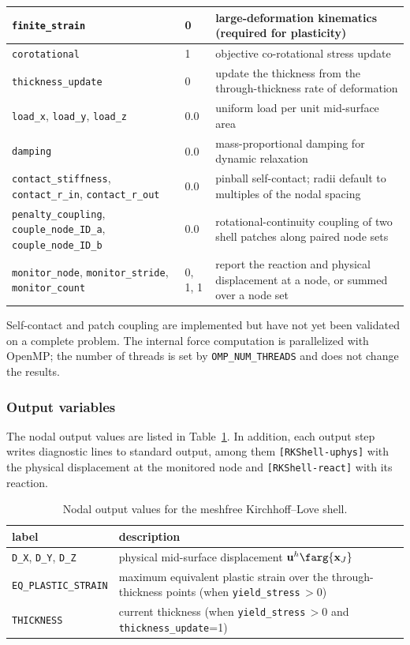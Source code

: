 \begin{longtable}{|p{1.7in}|p{0.7in}|p{3.4in}|}
\texttt{finite\_strain} & 0 & large-deformation kinematics (required for plasticity)\\ \hline
\texttt{corotational} & 1 & objective co-rotational stress update\\ \hline
\texttt{thickness\_update} & 0 & update the thickness from the through-thickness rate of deformation\\ \hline
\texttt{load\_x}, \texttt{load\_y}, \texttt{load\_z} & 0.0 & uniform load per unit mid-surface area\\ \hline
\texttt{damping} & 0.0 & mass-proportional damping for dynamic relaxation\\ \hline
\texttt{contact\_stiffness}, \texttt{contact\_r\_in}, \texttt{contact\_r\_out} & 0.0 & pinball self-contact; radii default to multiples of the nodal spacing\\ \hline
\texttt{penalty\_coupling}, \texttt{couple\_node\_ID\_a}, \texttt{couple\_node\_ID\_b} & 0.0 & rotational-continuity coupling of two shell patches along paired node sets\\ \hline
\texttt{monitor\_node}, \texttt{monitor\_stride}, \texttt{monitor\_count} & 0, 1, 1 & report the reaction and physical displacement at a node, or summed over a node set\\ \hline
\end{longtable}
Self-contact and patch coupling are implemented but have not yet been validated on a complete
problem. The internal force computation is parallelized with OpenMP; the number of threads is
set by \texttt{OMP\_NUM\_THREADS} and does not change the results.

\subsubsection{Output variables}
The nodal output values are listed in Table~\ref{tab.KLshell.output}. In addition, each output
step writes diagnostic lines to standard output, among them \texttt{[RKShell-uphys]} with the
physical displacement at the monitored node and \texttt{[RKShell-react]} with its reaction.
\begin{table}[!htbp]
\caption{\label{tab.KLshell.output} Nodal output values for the meshfree Kirchhoff--Love shell.}
\begin{center}
\begin{tabular}[c]{|p{1.9in}|>{\raggedright\arraybackslash}p{3.6in}|}
\hline
\textbf{label} & \textbf{description}\\
\hline
\texttt{D\_X}, \texttt{D\_Y}, \texttt{D\_Z} & physical mid-surface displacement $\mathbf{u}^{h}\farg{\mathbf{x}_{J}}$\\
\hline
\texttt{EQ\_PLASTIC\_STRAIN} & maximum equivalent plastic strain over the through-thickness points (when \texttt{yield\_stress}$\,>0$)\\
\hline
\texttt{THICKNESS} & current thickness (when \texttt{yield\_stress}$\,>0$ and \texttt{thickness\_update}=1)\\
\hline
\end{tabular}
\end{center}
\end{table}

